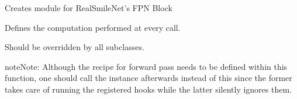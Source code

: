 \documentclass[letterpaper,10pt,english]{sphinxmanual}
\begin{document}
\begin{fulllineitems}

\begin{fulllineitems}
\label{\detokenize{model:model.DeepSmileNet._fpn_layers}}
\pysigstartsignatures
{}
\pysigstopsignatures
\sphinxAtStartPar
Creates module for RealSmileNet’s FPN Block

\end{fulllineitems}


\begin{fulllineitems}
\label{\detokenize{model:model.DeepSmileNet._is_full_backward_hook}}
\pysigstartsignatures
{}
\pysigstopsignatures
\end{fulllineitems}


\begin{fulllineitems}
\label{\detokenize{model:model.DeepSmileNet.forward}}
\pysigstartsignatures
{}
\pysigstopsignatures
\sphinxAtStartPar
Defines the computation performed at every call.

\sphinxAtStartPar
Should be overridden by all subclasses.

\begin{sphinxadmonition}{note}{Note:}
\sphinxAtStartPar
Although the recipe for forward pass needs to be defined within
this function, one should call the  instance afterwards
instead of this since the former takes care of running the
registered hooks while the latter silently ignores them.
\end{sphinxadmonition}

\end{fulllineitems}


\begin{fulllineitems}
\label{\detokenize{model:model.DeepSmileNet.training}}
\pysigstartsignatures
{}
\pysigstopsignatures
\end{fulllineitems}


\end{fulllineitems}
\end{document}
